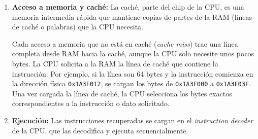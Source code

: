 \begin{enumerate}
    \item \textbf{Acceso a memoria y caché:}  
    La caché, parte del chip de la CPU, es una memoria intermedia rápida que mantiene copias de partes de la RAM (líneas de caché o palabras) que la CPU necesita.  

    Cada acceso a memoria que no está en caché (\textit{cache miss}) trae una línea completa desde RAM hacia la caché, aunque la CPU solo necesite unos pocos bytes.  
    La CPU solicita a la RAM la línea de caché que contiene la instrucción. Por ejemplo, si la línea son 64 bytes y la instrucción comienza en la dirección física \texttt{0x1A3F012}, se cargan los bytes de \texttt{0x1A3F000} a \texttt{0x1A3F03F}.  
    Una vez cargada la línea de caché, la CPU selecciona los bytes exactos correspondientes a la instrucción o dato solicitado.

    \item \textbf{Ejecución:}  
    Las instrucciones recuperadas se cargan en el \textit{instruction decoder} de la CPU, que las decodifica y ejecuta secuencialmente.
\end{enumerate}